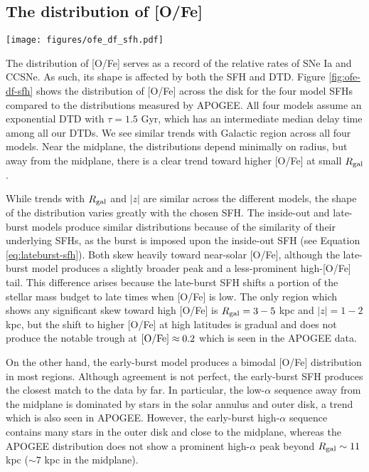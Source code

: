 \documentclass[twocolumn,twocolappendix,linenumbers]{aastex631}
\begin{document}
\subsection{The distribution of [O/Fe]}
\label{sec:ofe-df}

\begin{figure*}
    \centering
    \texttt{[image: figures/ofe\_df\_sfh.pdf]}
    \caption{Distributions of [O/Fe] from multi-zone models with different SFHs. All assume the exponential ($\tau=1.5$ Gyr) DTD. The format of each panel is the same as in Figure \ref{fig:feh-df-comparison}, except that all distributions are smoothed with a box-car width of 0.05 dex. Distributions from APOGEE DR17, binned and smoothed similarly, are presented in the right-most column for reference.}
    \label{fig:ofe-df-sfh}
\end{figure*}

The distribution of [O/Fe] serves as a record of the relative rates of SNe Ia and CCSNe. As such, its shape is affected by both the SFH and DTD. Figure \ref{fig:ofe-df-sfh} shows the distribution of [O/Fe] across the disk for the four model SFHs compared to the distributions measured by APOGEE. All four models assume an exponential DTD with $\tau=1.5$ Gyr, which has an intermediate median delay time among all our DTDs. We see similar trends with Galactic region across all four models. Near the midplane, the distributions depend minimally on radius, but away from the midplane, there is a clear trend toward higher [O/Fe] at small $R_{\rm gal}$.

While trends with $R_{\rm gal}$ and $|z|$ are similar across the different models, the shape of the distribution varies greatly with the chosen SFH. The inside-out and late-burst models produce similar distributions because of the similarity of their underlying SFHs, as the burst is imposed upon the inside-out SFH (see Equation \ref{eq:lateburst-sfh}). Both skew heavily toward near-solar [O/Fe], although the late-burst model produces a slightly broader peak and a less-prominent high-[O/Fe] tail. This difference arises because the late-burst SFH shifts a portion of the stellar mass budget to late times when [O/Fe] is low. The only region which shows any significant skew toward high [O/Fe] is $R_{\rm gal}=3-5$ kpc and $|z|=1-2$ kpc, but the shift to higher [O/Fe] at high latitudes is gradual and does not produce the notable trough at ${\rm [O/Fe]}\approx0.2$ which is seen in the APOGEE data. 

On the other hand, the early-burst model produces a bimodal [O/Fe] distribution in most regions. Although agreement is not perfect, the early-burst SFH produces the closest match to the data by far. In particular, the low-$\alpha$ sequence away from the midplane is dominated by stars in the solar annulus and outer disk, a trend which is also seen in APOGEE. However, the early-burst high-$\alpha$ sequence contains many stars in the outer disk and close to the midplane, whereas the APOGEE distribution does not show a prominent high-$\alpha$ peak beyond $R_{\rm gal}\sim11$ kpc ($\sim7$ kpc in the midplane). 
\end{document}
